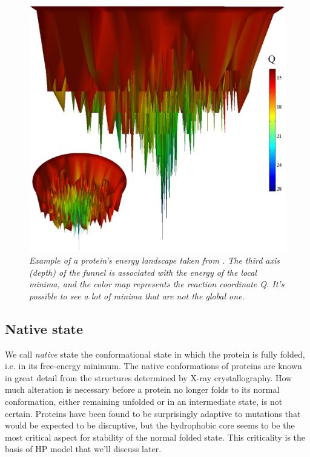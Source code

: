\begin{figure}[H]
    \centering
    \includegraphics[width=.75\textwidth]{./img/energy_landscape.png}
    \caption{\emph{Example of a protein's energy landscape taken from \cite{energyLandscape}.
                The third axis (depth) of the funnel is associated with the energy of the local minima, and the color map represents the reaction coordinate Q.
                It's possible to see a lot of minima that are not the global one.}}
    \label{fig:energy_landscape}
\end{figure}

\subsection{Native state}
We call \emph{native} state the conformational state in which the protein is fully folded, i.e. in its free-energy minimum.
The native conformations of proteins are known in great detail from the structures determined by X-ray crystallography.
How much alteration is necessary before a protein no longer folds to its normal conformation, either remaining unfolded or in an intermediate state, is not certain.
Proteins have been found to be surprisingly adaptive to mutations that would be expected to be disruptive, but the hydrophobic core seems to be the most critical aspect for stability of the normal folded state.
This criticality is the basis of HP model that we'll discuss later.

